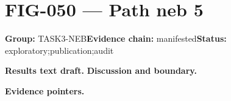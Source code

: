 \clearpage
\section{FIG-050 --- Path neb 5}
\label{figpage:fig-050}
\textbf{Group:} TASK3-NEB\quad \textbf{Evidence chain:} manifested\quad \textbf{Status:} exploratory;publication;audit

\textbf{Results text draft.} 
\textbf{Discussion and boundary.} 


\textbf{Evidence pointers.}



\vfill
